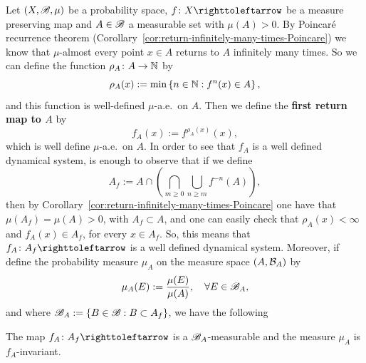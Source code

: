 Let $(X,\mathscr{B},\mu)$ be a probability space, $f\colon X\carr$ be a measure preserving map and $A\in\mathscr{B}$ a measurable set with $\mu(A)>0$. By Poincaré recurrence theorem (Corollary~\ref{cor:return-infinitely-many-times-Poincare}) we know that $\mu$-almost every point $x\in A$ returns to $A$ infinitely many times. So we can define the function $\rho_{A}\colon A\to\mathbb{N}$ by
\begin{displaymath}
  \rho_{A}(x):=\min\left\{n\in\mathbb{N} : f^{n}(x)\in A\right\},
\end{displaymath}
and this function is well-defined $\mu$-a.e.~on $A$. Then we define the \textbf{first return map to $A$} by
\begin{displaymath}
  f_{A}(x):=f^{\rho_{A}(x)}(x),
\end{displaymath}
which is well define $\mu$-a.e.~on $A$. In order to see that $f_{A}$ is a well defined dynamical system, is enough to observe that if we define
\begin{displaymath}
  A_{f}:=A\cap \left(\bigcap_{m\geq 0} \bigcup_{n\geq m} f^{-n}(A)\right),
\end{displaymath}
then by Corollary~\ref{cor:return-infinitely-many-times-Poincare} one have that $\mu(A_{f})=\mu(A)>0$, with $A_{f}\subset A$, and one can easily check that $\rho_{A}(x)<\infty$  and $f_{A}(x)\in A_{f}$, for every $x\in A_{f}$. So, this means that $f_{A}\colon A_{f}\carr$ is a well defined dynamical system. Moreover, if define the probability measure $\mu_{A}$ on the measure space $(A,\mathcal{B}_{A})$ by
\begin{displaymath}
  \mu_{A}(E):=\frac{\mu(E)}{\mu(A)}, \quad\forall E\in\mathscr{B}_{A},
\end{displaymath}
and where $\mathscr{B}_{A}:=\{B\in\mathscr{B} : B\subset A_{f}\}$, we have the following

\begin{theorem}\label{thm:inductive-map-is-mpm}
  The map $f_{A}\colon A_{f}\carr$ is a $\mathscr{B}_{A}$-measurable and the measure $\mu_{A}$ is $f_{A}$-invariant.
\end{theorem}


